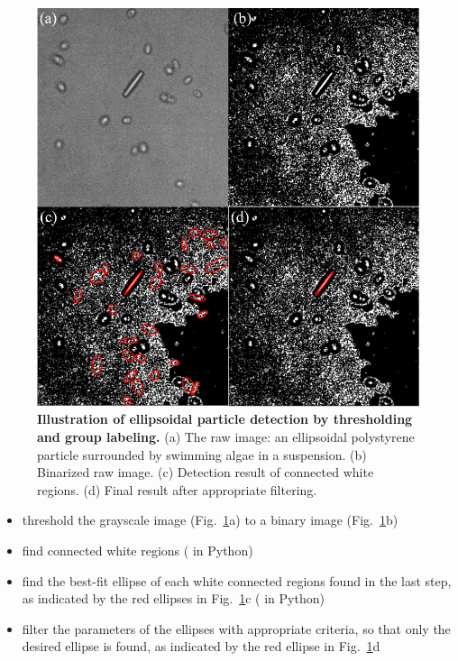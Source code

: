 \begin{figure}[!]
	\begin{center}
	\includegraphics[width=5.5 in]{Figs/2-Exp/5.pdf}
	\end{center}
	\caption[Figure 2.5:]
	{
	\textbf{Illustration of ellipsoidal particle detection by thresholding and group labeling.}
	(a) The raw image: an ellipsoidal polystyrene particle surrounded by swimming algae in a suspension.
	(b) Binarized raw image.
	(c) Detection result of connected white regions.
	(d) Final result after appropriate filtering.
	}
	\label{fig:2-5}
\end{figure}

\begin{itemize}
	\item threshold the grayscale image (Fig.~\ref{fig:2-5}a) to a binary image (Fig.~\ref{fig:2-5}b)
	\item find connected white regions ( in Python)
	\item find the best-fit ellipse of each white connected regions found in the last step, as indicated by the red ellipses in Fig.~\ref{fig:2-5}c ( in Python)
	\item filter the parameters of the ellipses with appropriate criteria, so that only the desired ellipse is found, as indicated by the red ellipse in Fig.~\ref{fig:2-5}d
\end{itemize}

